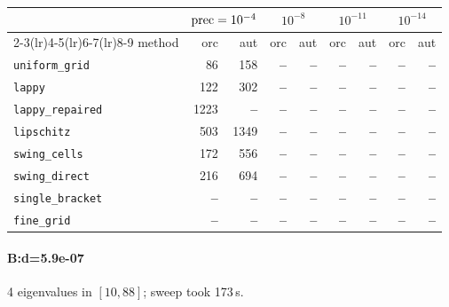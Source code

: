 \begin{center}
\small
\begin{tabular}{lrrrrrrrr}
\toprule
& \multicolumn{2}{c}{$\mathrm{prec}=10^{-4}$} & \multicolumn{2}{c}{$10^{-8}$} & \multicolumn{2}{c}{$10^{-11}$} & \multicolumn{2}{c}{$10^{-14}$} \\
\cmidrule(lr){2-3}\cmidrule(lr){4-5}\cmidrule(lr){6-7}\cmidrule(lr){8-9}
method & orc & aut & orc & aut & orc & aut & orc & aut \\
\midrule
\texttt{uniform\_grid} & 86 & 158 & \textbf{--} & \textbf{--} & \textbf{--} & \textbf{--} & \textbf{--} & \textbf{--} \\
\texttt{lappy} & 122 & 302 & \textbf{--} & \textbf{--} & \textbf{--} & \textbf{--} & \textbf{--} & \textbf{--} \\
\texttt{lappy\_repaired} & 1223 & \textbf{--} & \textbf{--} & \textbf{--} & \textbf{--} & \textbf{--} & \textbf{--} & \textbf{--} \\
\texttt{lipschitz} & 503 & 1349 & \textbf{--} & \textbf{--} & \textbf{--} & \textbf{--} & \textbf{--} & \textbf{--} \\
\texttt{swing\_cells} & 172 & 556 & \textbf{--} & \textbf{--} & \textbf{--} & \textbf{--} & \textbf{--} & \textbf{--} \\
\texttt{swing\_direct} & 216 & 694 & \textbf{--} & \textbf{--} & \textbf{--} & \textbf{--} & \textbf{--} & \textbf{--} \\
\midrule
\texttt{single\_bracket} & \textbf{--} & \textbf{--} & \textbf{--} & \textbf{--} & \textbf{--} & \textbf{--} & \textbf{--} & \textbf{--} \\
\texttt{fine\_grid} & \textbf{--} & \textbf{--} & \textbf{--} & \textbf{--} & \textbf{--} & \textbf{--} & \textbf{--} & \textbf{--} \\
\bottomrule
\end{tabular}
\end{center}

\paragraph{B:d=5.9e-07} 4 eigenvalues in $[10, 88]$; sweep took 173\,s.

